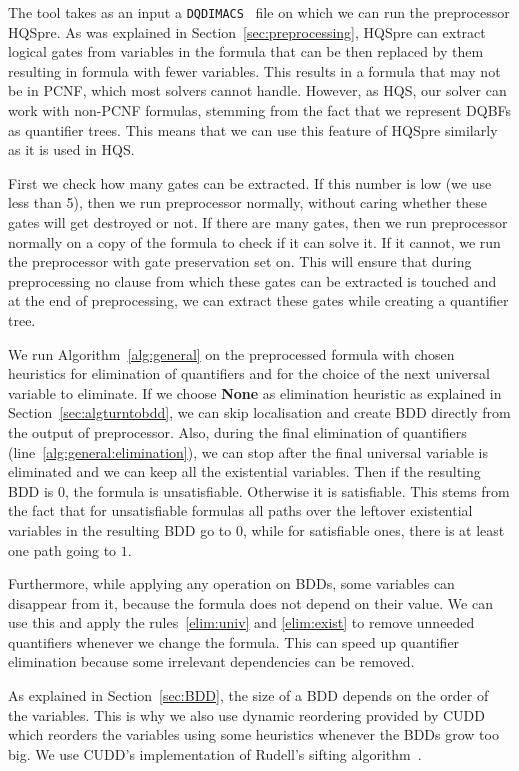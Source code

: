 \documentclass[
  digital, %
  color,
  twoside, %
  table,   %
  nolof,     %
  nolot,     %
]{fithesis3}
\theoremstyle{definition}
\theoremstyle{remark}
\newcommand{\DQDIMACS}[0]{\texttt{DQDIMACS}}
\newcommand{\QEnone}{\textbf{None}}
\begin{document}
The tool takes as an input a \DQDIMACS{}~\cite{iDQandDQDIMACS} file on which we can run the preprocessor HQSpre. As was explained in Section~\ref{sec:preprocessing}, HQSpre can extract logical gates from variables in the formula that can be then replaced by them resulting in formula with fewer variables. This results in a formula that may not be in PCNF, which most solvers cannot handle. However, as HQS, our solver can work with non-PCNF formulas, stemming from the fact that we represent DQBFs as quantifier trees. This means that we can use this feature of HQSpre similarly as it is used in HQS.

First we check how many gates can be extracted. If this number is low (we use less than 5), then we run preprocessor normally, without caring whether these gates will get destroyed or not. If there are many gates, then we run preprocessor normally on a copy of the formula to check if it can solve it. If it cannot, we run the preprocessor with gate preservation set on. This will ensure that during preprocessing no clause from which these gates can be extracted is touched and at the end of preprocessing, we can extract these gates while creating a quantifier tree.

We run Algorithm~\ref{alg:general} on the preprocessed formula with chosen heuristics for elimination of quantifiers and for the choice of the next universal variable to eliminate. If we choose \QEnone{} as elimination heuristic as explained in Section~\ref{sec:algturntobdd}, we can skip localisation and create BDD directly from the output of preprocessor. Also, during the final elimination of quantifiers (line~\ref{alg:general:elimination}), we can stop after the final universal variable is eliminated and we can keep all the existential variables. Then if the resulting BDD is $0$, the formula is unsatisfiable. Otherwise it is satisfiable. This stems from the fact that for unsatisfiable formulas all paths over the leftover existential variables in the resulting BDD go to $0$, while for satisfiable ones, there is at least one path going to $1$.

Furthermore, while applying any operation on BDDs, some variables can disappear from it, because the formula does not depend on their value. We can use this and apply the rules~\eqref{elim:univ} and \eqref{elim:exist} to remove unneeded quantifiers whenever we change the formula. This can speed up quantifier elimination because some irrelevant dependencies can be removed.

As explained in Section~\ref{sec:BDD}, the size of a BDD depends on the order of the variables. This is why we also use dynamic reordering provided by CUDD which reorders the variables using some heuristics whenever the BDDs grow too big. We use CUDD's implementation of Rudell's sifting algorithm~\cite{BDDsifting}.
\end{document}
